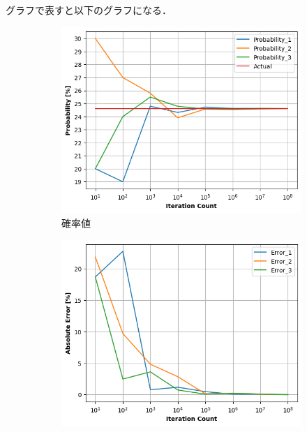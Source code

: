 \documentclass[a4j, titlepage]{jarticle}
\begin{document}
      \clearpage
      グラフで表すと以下のグラフになる．
      \begin{figure}[htb]
        \begin{subfigure}[b]{0.38\textwidth}
            \centering
            \includegraphics[height=\textwidth]{../Dir_Height/img_height.png}
            \caption{確率値}
            \label{fig:height}
        \end{subfigure}
        \hspace{50pt}
        \begin{subfigure}[b]{0.38\textwidth}
          \includegraphics[height=\textwidth]{../Dir_Height/img_error.png}

\end{subfigure}
\end{figure}
\end{document}
